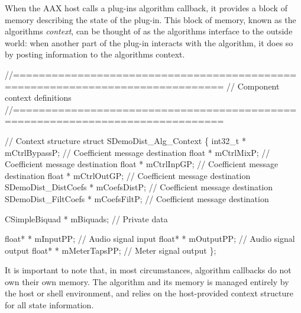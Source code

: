  When the A\+A\+X host calls a plug-\/in\textquotesingle{}s algorithm callback, it provides a block of memory describing the state of the plug-\/in. This block of memory, known as the algorithm\textquotesingle{}s {\itshape context}, can be thought of as the algorithm\textquotesingle{}s interface to the outside world\+: when another part of the plug-\/in interacts with the algorithm, it does so by posting information to the algorithm\textquotesingle{}s context.


\begin{DoxyCode}
\textcolor{comment}{//==============================================================================}
\textcolor{comment}{// Component context definitions}
\textcolor{comment}{//==============================================================================}

\textcolor{comment}{// Context structure}
\textcolor{keyword}{struct }SDemoDist\_Alg\_Context
\{
    int32\_t                 * mCtrlBypassP;                 \textcolor{comment}{// Coefficient message destination}
    \textcolor{keywordtype}{float}                   * mCtrlMixP;                    \textcolor{comment}{// Coefficient message destination}
    \textcolor{keywordtype}{float}                   * mCtrlInpGP;                   \textcolor{comment}{// Coefficient message destination}
    \textcolor{keywordtype}{float}                   * mCtrlOutGP;                   \textcolor{comment}{// Coefficient message destination}
    SDemoDist\_DistCoefs     * mCoefsDistP;                  \textcolor{comment}{// Coefficient message destination}
    SDemoDist\_FiltCoefs     * mCoefsFiltP;                  \textcolor{comment}{// Coefficient message destination}

    CSimpleBiquad           * mBiquads;                     \textcolor{comment}{// Private data}

    \textcolor{keywordtype}{float}*                  * mInputPP;                     \textcolor{comment}{// Audio signal input}
    \textcolor{keywordtype}{float}*                  * mOutputPP;                    \textcolor{comment}{// Audio signal output}
    \textcolor{keywordtype}{float}*                  * mMeterTapsPP;                 \textcolor{comment}{// Meter signal output}
\};
\end{DoxyCode}


 It is important to note that, in most circumstances, algorithm callbacks do not own their own memory. The algorithm and its memory is managed entirely by the host or shell environment, and relies on the host-\/provided context structure for all state information.

